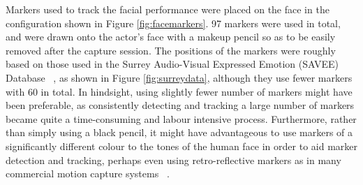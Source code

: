 Markers used to track the facial performance were placed on the face in the configuration shown in Figure \ref{fig:facemarkers}. 97 markers were used in total, and were drawn onto the actor's face with a makeup pencil so as to be easily removed after the capture session. The positions of the markers were roughly based on those used in the Surrey Audio-Visual Expressed Emotion (SAVEE) Database ~\cite{Surrey}, as shown in Figure \ref{fig:surreydata}, although they use fewer markers with 60 in total. In hindsight, using slightly fewer number of markers might have been preferable, as consistently detecting and tracking a large number of markers became quite a time-consuming and labour intensive process. Furthermore, rather than simply using a black pencil, it might have advantageous to use markers of a significantly different colour to the tones of the human face in order to aid marker detection and tracking, perhaps even using retro-reflective markers as in many commercial motion capture systems ~\cite{Vicon}.

